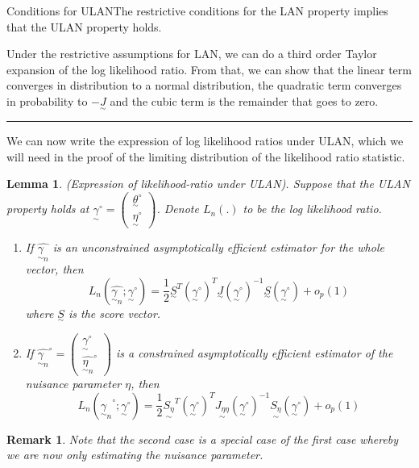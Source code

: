 \documentclass[twoside]{article}
\newtheorem{lemma}[theorem]{Lemma}
\newtheorem{remark}[theorem]{Remark}
\newenvironment{proof}{{\bf Proof:}}{\hfill\rule{2mm}{2mm}}
\newcommand{\utilde}{\underset{\sim}}
\begin{document}
\begin{proposition_exam}{Conditions for ULAN}{}The restrictive conditions for the LAN property implies that the ULAN property holds.
\end{proposition_exam}

\begin{proof} Under the restrictive assumptions for LAN, we can do a third order Taylor expansion of the log likelihood ratio. From that, we can show that the linear term converges in distribution to a normal distribution, the quadratic term converges in probability to $-\utilde{J}$ and the cubic term is the remainder that goes to zero. 
\end{proof}


We can now write the expression of log likelihood ratios under ULAN, which we will need in the proof of the limiting distribution of the likelihood ratio statistic.

\begin{lemma}(Expression of likelihood-ratio under ULAN). Suppose that the ULAN property holds at $\utilde{\gamma}^{\circ} = \begin{pmatrix}\utilde{\theta}^{\circ}\\ \utilde{\eta}^{\circ} \end{pmatrix}$. Denote $L_n(.)$ to be the log likelihood ratio.
\begin{enumerate}
\item If $\hat{\utilde{\gamma}_n}$ is an unconstrained asymptotically efficient estimator for the whole vector, then 
$$
L_n(\hat{\utilde{\gamma}_n};\utilde{\gamma}^{\circ}) = \frac{1}{2}\utilde{S}^{T}(\utilde{\gamma}^{\circ})^T\utilde{J}(\utilde{\gamma}^{\circ})^{-1}\utilde{S}(\utilde{\gamma}^{\circ}) + o_p(1)
$$
where $\utilde{S}$ is the score vector.
\item If $\hat{\utilde{\gamma}_n}^{\circ} = \begin{pmatrix}\utilde{\gamma}^{\circ} \\ \hat{\utilde{\eta}_n}^{\circ} \end{pmatrix}$  is a constrained asymptotically efficient estimator of the nuisance parameter $\eta$, then 
$$
L_n(\hat{\utilde{\gamma}_n}^{\circ};\utilde{\gamma}^{\circ}) = \frac{1}{2}\utilde{S_{\eta}}^{T}(\utilde{\gamma}^{\circ})^T\utilde{J_{\eta \eta}}(\utilde{\gamma}^{\circ})^{-1}\utilde{S_{\eta}}(\utilde{\gamma}^{\circ}) + o_p(1)
$$
\end{enumerate}
\end{lemma}

\begin{remark}Note that the second case is a special case of the first case whereby we are now only estimating the nuisance parameter.
\end{remark}
\end{document}
